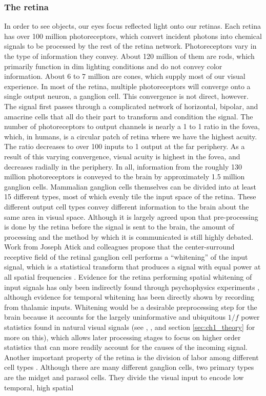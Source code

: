\subsubsection{The retina}
In order to see objects, our eyes focus reflected light onto our retinas. Each retina has over 100 million photoreceptors, which convert incident photons into chemical signals to be processed by the rest of the retina network. Photoreceptors vary in the type of information they convey. About 120 million of them are rods, which primarily function in dim lighting conditions and do not convey color information. About 6 to 7 million are cones, which supply most of our visual experience. In most of the retina, multiple photoreceptors will converge onto a single output neuron, a ganglion cell. This convergence is not direct, however. The signal first passes through a complicated network of horizontal, bipolar, and amacrine cells that all do their part to transform and condition the signal. The number of photoreceptors to output channels is nearly a 1 to 1 ratio in the fovea, which, in humans, is a circular patch of retina where we have the highest acuity. The ratio decreases to over 100 inputs to 1 output at the far periphery. As a result of this varying convergence, visual acuity is highest in the fovea, and decreases radially in the periphery. In all, information from the roughly 130 million photoreceptors is conveyed to the brain by approximately 1.5 million ganglion cells. Mammalian ganglion cells themselves can be divided into at least 15 different types, most of which evenly tile the input space of the retina. These different output cell types convey different information to the brain about the same area in visual space. Although it is largely agreed upon that pre-processing is done by the retina before the signal is sent to the brain, the amount of processing and the method by which it is communicated is still highly debated. Work from Joseph Atick and colleagues propose that the center-surround receptive field of the retinal ganglion cell performs a ``whitening'' of the input signal, which is a statistical transform that produces a signal with equal power at all spatial frequencies \parencite{atick1990towards, atick1992what}. Evidence for the retina performing spatial whitening of input signals has only been indirectly found through psychophysics experiments \parencite{atick1992what}, although evidence for temporal whitening has been directly shown \parencite{dong1995statistics} by recording from thalamic inputs. Whitening would be a desirable preprocessing step for the brain because it accounts for the largely uninformative and ubiquitous $1/f$ power statistics found in natural visual signals (see \parencite{field1999wavelets}, \parencite{field1989statistics}, and section \ref{sec:ch1_theory} for more on this), which allows later processing stages to focus on higher order statistics that can more readily account for the causes of the incoming signal. Another important property of the retina is the division of labor among different cell types \parencite{van1995information}. Although there are many different ganglion cells, two primary types are the midget and parasol cells. They divide the visual input to encode low temporal, high spatial 